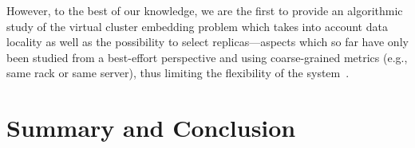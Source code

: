 \documentclass[conference,10pt]{IEEEtran}
\newcommand{\CC}{\textsc{NI}}
\newcommand{\FP}{\textsc{FP}}
\newcommand{\RS}{\textsc{RS}}
\newcommand{\BW}{\textsc{BW}}
\newcommand{\MA}{\textsc{MA}}
\begin{document}
However, to the best of our knowledge, we are the first to provide an algorithmic
study of the virtual cluster embedding problem which takes into account
data locality as well as the possibility to select replicas---aspects which so far have only
been studied from a best-effort perspective and using coarse-grained metrics (e.g., same rack or same server), thus limiting the flexibility of the
system~\cite{local-schedule-1,local-schedule-2,local-schedule-3}.


\section{Summary and Conclusion}\label{sec:conclusion}

\end{document}
